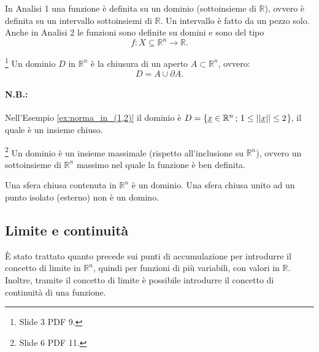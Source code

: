 In Analisi 1 una funzione è definita su un dominio (sottoinsieme di $\mathbb R$), ovvero è definita su un intervallo sottoinsiemi di $\mathbb R$. Un intervallo è fatto da un pezzo solo. Anche in Analisi 2 le funzioni sono definite su domini e sono del tipo
\begin{equation*}
    f\colon X\subseteq\mathbb R^n\rightarrow\mathbb R.
\end{equation*}

\begin{definition}[Dominio]\footnote{Slide 3 PDF 9.}
    Un dominio $D$ in $\mathbb R^n$ è la chiusura di un aperto $A\subset\mathbb R^n$, ovvero:
    \begin{equation}\label{eq:dominio_R_n}
        D=A\cup\partial A.
    \end{equation}
\end{definition}

\paragraph{N.B.:} Nell'Esempio \ref{ex:norma_in_(1,2)} il dominio è $D=\{\uline x\in\mathbb R^n\,;\, 1\leq||\uline x||\leq 2$\}, il quale è un insieme chiuso.

\begin{remark}\footnote{Slide 6 PDF 11.}
    Un dominio è un insieme massimale (rispetto all'inclusione su $\mathbb R^n$), ovvero un sottoinsieme di $\mathbb R^n$ massimo nel quale la funzione è ben definita.
\end{remark}

\begin{example}
    Una sfera chiusa contenuta in $\mathbb R^n$ è un dominio. Una sfera chiusa unito ad un punto isolato (esterno) non è un domino.
\end{example}

\subsection{Limite e continuità}
È stato trattato quanto precede sui punti di accumulazione per introdurre il concetto di limite in $\mathbb R^n$, quindi per funzioni di più variabili, con valori in $\mathbb R$. Inoltre, tramite il concetto di limite è possibile introdurre il concetto di continuità di una funzione.

